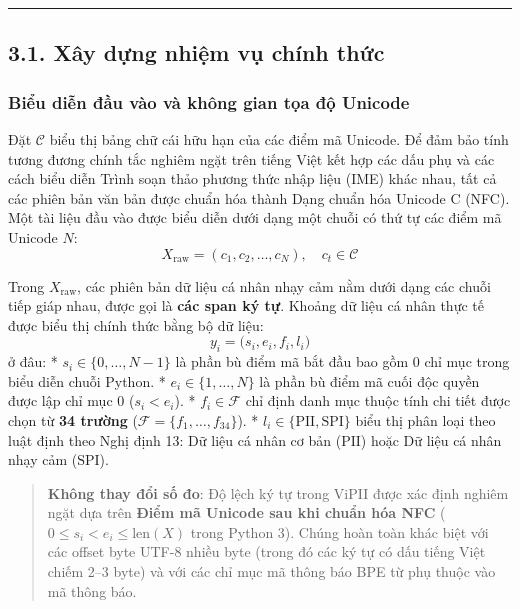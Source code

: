 \documentclass[
  11pt,
  a4paper,
]{article}
\begin{document}
\begin{center}\rule{0.5\linewidth}{0.5pt}\end{center}

\subsection{3.1. Xây dựng nhiệm vụ chính
thức}\label{xuxe2y-dux1ef1ng-nhiux1ec7m-vux1ee5-chuxednh-thux1ee9c}

\subsubsection{Biểu diễn đầu vào và không gian tọa độ
Unicode}\label{biux1ec3u-diux1ec5n-ux111ux1ea7u-vuxe0o-vuxe0-khuxf4ng-gian-tux1ecda-ux111ux1ed9-unicode}

Đặt \(\mathcal{C}\) biểu thị bảng chữ cái hữu hạn của các điểm mã
Unicode. Để đảm bảo tính tương đương chính tắc nghiêm ngặt trên tiếng
Việt kết hợp các dấu phụ và các cách biểu diễn Trình soạn thảo phương
thức nhập liệu (IME) khác nhau, tất cả các phiên bản văn bản được chuẩn
hóa thành Dạng chuẩn hóa Unicode C (NFC). Một tài liệu đầu vào được biểu
diễn dưới dạng một chuỗi có thứ tự các điểm mã Unicode \(N\):
\[X_{\text{raw}} = (c_1, c_2, \dots, c_N), \quad c_t \in \mathcal{C}\]

Trong \(X_{\text{raw}}\), các phiên bản dữ liệu cá nhân nhạy cảm nằm
dưới dạng các chuỗi tiếp giáp nhau, được gọi là \textbf{các span ký tự}.
Khoảng dữ liệu cá nhân thực tế được biểu thị chính thức bằng bộ dữ liệu:
\[y_i = \bigl(s_i, e_i, f_i, l_i\bigr)\] ở đâu: *
\(s_i \in \{0, \dots, N-1\}\) là phần bù điểm mã bắt đầu bao gồm 0 chỉ
mục trong biểu diễn chuỗi Python. * \(e_i \in \{1, \dots, N\}\) là phần
bù điểm mã cuối độc quyền được lập chỉ mục 0 (\(s_i < e_i\)). *
\(f_i \in \mathcal{F}\) chỉ định danh mục thuộc tính chi tiết được chọn
từ \textbf{34 trường} (\(\mathcal{F} = \{f_1, \dots, f_{34}\}\)). *
\(l_i \in \{\text{PII}, \text{SPI}\}\) biểu thị phân loại theo luật định
theo Nghị định 13: Dữ liệu cá nhân cơ bản (\(\text{PII}\)) hoặc Dữ liệu
cá nhân nhạy cảm (\(\text{SPI}\)).

\begin{quote}
\textbf{Không thay đổi số đo}: Độ lệch ký tự trong ViPII được xác định
nghiêm ngặt dựa trên \textbf{Điểm mã Unicode sau khi chuẩn hóa NFC}
(\(0 \le s_i < e_i \le \text{len}(X)\) trong Python 3). Chúng hoàn toàn
khác biệt với các offset byte UTF-8 nhiều byte (trong đó các ký tự có
dấu tiếng Việt chiếm 2--3 byte) và với các chỉ mục mã thông báo BPE từ
phụ thuộc vào mã thông báo.
\end{quote}
\end{document}
